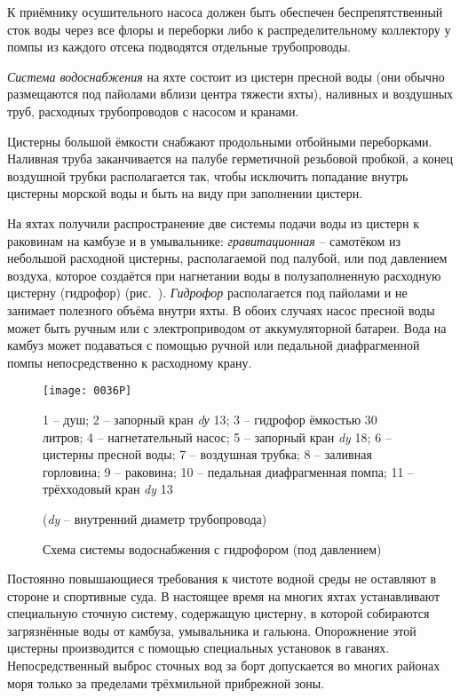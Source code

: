 К приёмнику осушительного насоса должен быть обеспечен
беспрепятственный сток воды через все флоры и переборки либо к
распределительному коллектору у помпы из каждого отсека подводятся
отдельные трубопроводы.

\textit{Система водоснабжения} на яхте
состоит из цистерн пресной воды (они обычно размещаются под пайолами
вблизи центра тяжести яхты), наливных и воздушных труб, расходных
трубопроводов с насосом и кранами.

Цистерны большой ёмкости снабжают продольными отбойными
переборками. Наливная труба заканчивается на палубе герметичной
резьбовой пробкой, а конец воздушной трубки располагается так, чтобы
исключить попадание внутрь цистерны морской воды и быть на виду при
заполнении цистерн.

На яхтах получили распространение две системы подачи воды из цистерн к
раковинам на камбузе и в умывальнике:
\textit{гравитационная} \---
самотёком из небольшой расходной цистерны, располагаемой под палубой,
или под давлением воздуха, которое создаётся при нагнетании воды в
полузаполненную расходную цистерну (гидрофор)
(рис.~). \textit{Гидрофор}
располагается под пайолами и не занимает полезного объёма внутри
яхты. В обоих случаях насос пресной воды может быть ручным или с
электроприводом от аккумуляторной батареи. Вода на камбуз может
подаваться с помощью ручной или педальной диафрагменной помпы
непосредственно к расходному крану.

\begin{figure}[htb]
  \centering
  \texttt{[image: 0036P]}
  \caption{Схема системы водоснабжения с гидрофором (под давлением)}
  \label{fig:36}
  \small
  \centering{}
  1 \--- душ; 2 \--- запорный кран \textit{dу} 13; 3 \--- гидрофор ёмкостью 30 литров; 4 \--- нагнетательный насос; 5 \--- запорный кран \textit{dy} 18; 6 \--- цистерны пресной воды; 7 \--- воздушная трубка; 8 \--- заливная горловина; 9 \--- раковина; 10 \--- педальная диафрагменная помпа; 11 \--- трёхходовый кран \textit{dy} 13

  (\textit{dy} \--- внутренний диаметр трубопровода)
\end{figure}

Постоянно повышающиеся требования к чистоте водной среды не оставляют
в стороне и спортивные суда. В настоящее время на многих яхтах
устанавливают специальную сточную систему, содержащую цистерну, в
которой собираются загрязнённые воды от камбуза, умывальника и
гальюна. Опорожнение этой цистерны производится с помощью специальных
установок в гаванях. Непосредственный выброс сточных вод за борт
допускается во многих районах моря только за пределами трёхмильной
прибрежной зоны.


